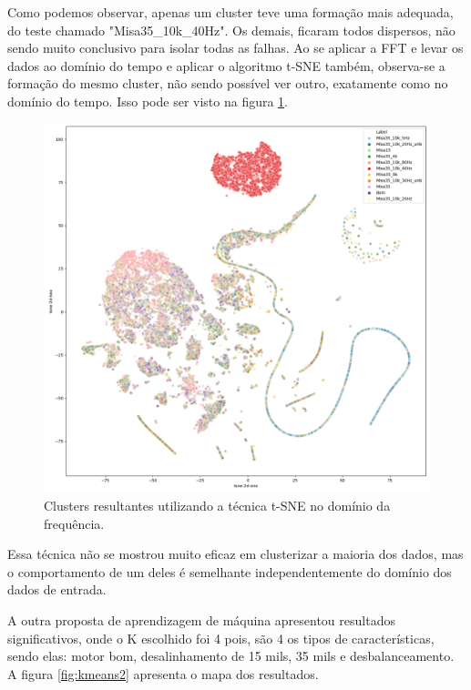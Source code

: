 Como podemos observar, apenas um cluster teve uma formação mais adequada, do teste chamado "Misa35\_10k\_40Hz". Os demais, ficaram todos
dispersos, não sendo muito conclusivo para isolar todas as falhas. Ao se aplicar a FFT e levar os dados ao domínio do tempo e aplicar o
algoritmo t-SNE também, observa-se a formação do mesmo cluster, não sendo possível ver outro, exatamente como no domínio do tempo. Isso pode
ser visto na figura \ref{fig:fft-t-sne-1}. 

\begin{figure}[H]
    \caption{Clusters resultantes utilizando a técnica t-SNE no domínio da frequência.}
    \begin{center}
        \includegraphics[scale=.25]{resultados/img/fft-t-sne-1.png}
    \end{center}
    \label{fig:fft-t-sne-1}
\end{figure}

Essa técnica não se mostrou muito eficaz em clusterizar a maioria dos dados, mas o comportamento de um deles é semelhante independentemente
do domínio dos dados de entrada.

A outra proposta de aprendizagem de máquina apresentou resultados significativos, onde o K escolhido foi 4 pois, são 4 os tipos de
características, sendo elas: motor bom, desalinhamento de 15 mils, 35 mils e desbalanceamento. A figura \ref{fig:kmeans2} apresenta o mapa
dos resultados.

